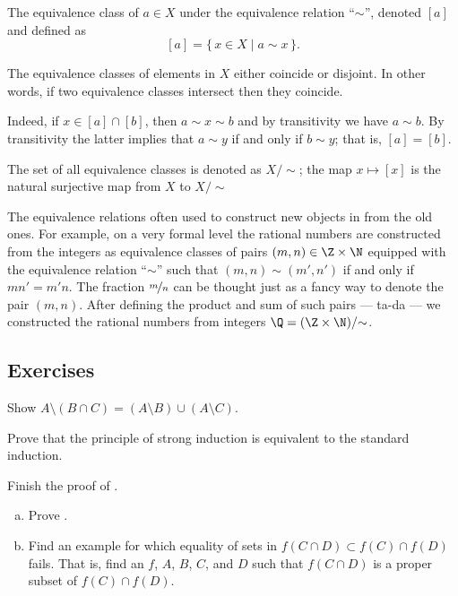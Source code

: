\documentclass[12pt]{book}
\begin{document}
The equivalence class of $a\in X$ under the equivalence relation ``$\sim$'', denoted $[a]$ and defined as
$$[a] = \{\,x\in X \mid a\sim x\,\}.$$

The equivalence classes of elements in $X$ either coincide or disjoint. 
In other words, if two equivalence classes intersect then they coincide.

Indeed, if $x\in [a]\cap [b]$, then $a\sim x\sim b$ and by transitivity we have $a\sim b$.
By transitivity the latter implies that $a\sim y$ if and only if $b\sim y$; 
that is, $[a]=[b]$.

The set of all equivalence classes is denoted as $X/{\sim}$;
the map $x\mapsto[x]$ is the natural surjective map from $X$ to $X/{\sim}$

The equivalence relations often used to construct new objects in from the old ones.
For example, on a very formal level the rational numbers are constructed from the integers as equivalence classes of pairs $(m,n)\in \Z\times \N$ equipped with the equivalence relation ``$\sim$'' such that $(m,n)\sim (m',n')$ if and only if $mn'=m'n$. 
The fraction $\nicefrac{m}{n}$ can be thought just as a fancy way to denote the pair $(m,n)$.
After defining the product and sum of such pairs --- ta-da ---
we constructed the rational numbers from integers $\Q=(\Z\times\N)/{\sim}$.

\subsection*{Exercises}

\begin{exercise}
Show
$A \setminus (B \cap C) = (A \setminus B) \cup (A \setminus C)$.
\end{exercise}

\begin{exercise}
Prove that the principle of strong induction is equivalent to the standard
induction.
\end{exercise}

\begin{exercise}
Finish the proof of .
\end{exercise}

\begin{exercise}
\begin{enumerate}[a)]
\item
Prove .
\item
Find an example for which equality of sets
in 
$f( C \cap D) \subset f (C) \cap f (D)$
fails.
That is, find an $f$, $A$, $B$, $C$, and $D$ such that
$f( C \cap D)$ is a proper subset of $f(C) \cap f(D)$.
\end{enumerate}
\end{exercise}
\end{document}

